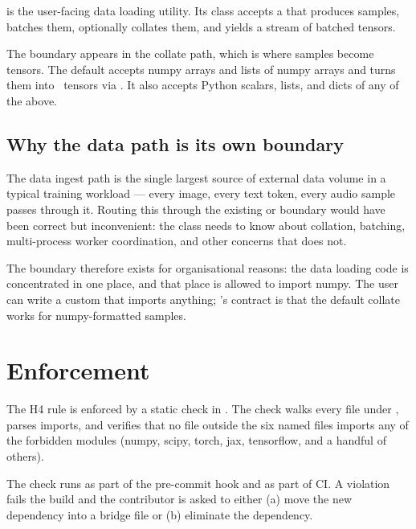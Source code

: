  is the user-facing data
loading utility. Its  class accepts a
 that produces samples, batches them, optionally
collates them, and yields a stream of batched tensors.

The boundary appears in the collate path, which is where samples
become tensors. The default  accepts numpy arrays
and lists of numpy arrays and turns them into \Lucid\ tensors via
. It also accepts Python scalars, lists,
and dicts of any of the above.

\subsection{Why the data path is its own boundary}
\label{ssec:bridge_boundaries:why_data}

The data ingest path is the single largest source of external data
volume in a typical training workload --- every image, every text
token, every audio sample passes through it. Routing this through
the existing  or 
boundary would have been correct but inconvenient: the
 class needs to know about collation, batching,
multi-process worker coordination, and other concerns that
 does not.

The boundary therefore exists for organisational reasons: the data
loading code is concentrated in one place, and that place is
allowed to import numpy. The user can write a custom
 that imports anything; \Lucid's contract is that
the default collate works for numpy-formatted samples.

\section{Enforcement}
\label{sec:bridge_boundaries:enforcement}

The H4 rule is enforced by a static check in
. The check walks every 
file under , parses imports, and verifies that no
file outside the six named files imports any of the forbidden
modules (numpy, scipy, torch, jax, tensorflow, and a handful of
others).

The check runs as part of the pre-commit hook and as part of CI. A
violation fails the build and the contributor is asked to either
(a) move the new dependency into a bridge file or (b) eliminate
the dependency.

